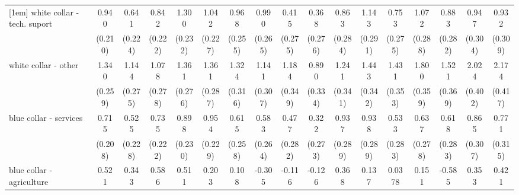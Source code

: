 {\begin{tabular}{l*{16}{c}}
[1em]
white collar - tech. suport&       0.940\sym{***}&       0.641\sym{**} &       0.842\sym{***}&       1.300\sym{***}&       1.042\sym{***}&       0.968\sym{***}&       0.990\sym{***}&       0.415         &       0.368         &       0.863\sym{**} &       1.143\sym{***}&       0.753\sym{**} &       1.072\sym{***}&       0.883\sym{**} &       0.947\sym{**} &       0.932\sym{**} \\
                    &     (0.210)         &     (0.224)         &     (0.222)         &     (0.232)         &     (0.227)         &     (0.255)         &     (0.265)         &     (0.275)         &     (0.276)         &     (0.284)         &     (0.291)         &     (0.275)         &     (0.288)         &     (0.282)         &     (0.304)         &     (0.309)         \\
[1em]
white collar - other&       1.340\sym{***}&       1.144\sym{***}&       1.078\sym{***}&       1.361\sym{***}&       1.361\sym{***}&       1.324\sym{***}&       1.141\sym{***}&       1.184\sym{***}&       0.890\sym{**} &       1.241\sym{***}&       1.443\sym{***}&       1.431\sym{***}&       1.800\sym{***}&       1.521\sym{***}&       2.024\sym{***}&       2.174\sym{***}\\
                    &     (0.259)         &     (0.275)         &     (0.278)         &     (0.276)         &     (0.287)         &     (0.316)         &     (0.307)         &     (0.349)         &     (0.334)         &     (0.341)         &     (0.342)         &     (0.353)         &     (0.359)         &     (0.369)         &     (0.402)         &     (0.417)         \\
[1em]
blue collar - services&       0.715\sym{***}&       0.525\sym{*}  &       0.735\sym{***}&       0.898\sym{***}&       0.954\sym{***}&       0.615\sym{*}  &       0.583\sym{*}  &       0.477         &       0.322         &       0.937\sym{**} &       0.938\sym{**} &       0.533         &       0.637\sym{*}  &       0.618\sym{*}  &       0.865\sym{**} &       0.771\sym{*}  \\
                    &     (0.208)         &     (0.228)         &     (0.222)         &     (0.230)         &     (0.229)         &     (0.258)         &     (0.264)         &     (0.282)         &     (0.273)         &     (0.289)         &     (0.289)         &     (0.283)         &     (0.278)         &     (0.283)         &     (0.307)         &     (0.315)         \\
[1em]
blue collar - agriculture&       0.521         &       0.343         &       0.586         &       0.511         &       0.203         &       0.108         &      -0.305         &      -0.116         &      -0.126         &       0.368         &       0.137         &      0.0378         &       0.151         &      -0.585         &       0.353         &       0.421         \\

\end{tabular}}
